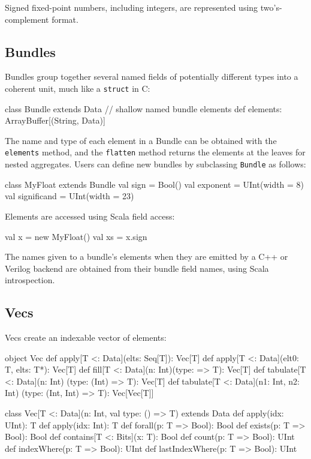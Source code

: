 \documentclass[10pt,twocolumn]{article}
\def\code#1{{\small\tt #1}}
\begin{document}
\noindent
Signed fixed-point
numbers, including integers, are represented using two's-complement
format.  

\subsection{Bundles}

Bundles group together several named fields of potentially different
types into a coherent unit, much like a \code{struct} in C:

\begin{scala}
class Bundle extends Data {
  // shallow named bundle elements
  def elements: ArrayBuffer[(String, Data)]
}
\end{scala}

\noindent
The name and type of each element in a Bundle can be obtained with the
\code{elements} method, and the \code{flatten} method returns the
elements at the leaves for nested aggregates.  Users can define new
bundles by subclassing \code{Bundle} as follows:

\begin{scala}
class MyFloat extends Bundle {
  val sign        = Bool()
  val exponent    = UInt(width = 8)
  val significand = UInt(width = 23)
}
\end{scala}
\noindent
Elements are accessed using Scala field access:

\begin{scala}
val x  = new MyFloat()
val xs = x.sign
\end{scala}

The names given to a bundle's elements when they are emitted by a C++
or Verilog backend are obtained from their bundle field names, using
Scala introspection.

\subsection{Vecs}

Vecs create an indexable vector of elements: 

\begin{scala}
object Vec {
  def apply[T <: Data](elts: Seq[T]): Vec[T]
  def apply[T <: Data](elt0: T, elts: T*): Vec[T]
  def fill[T <: Data](n: Int)(type: => T): Vec[T]
  def tabulate[T <: Data](n: Int)
        (type: (Int) => T): Vec[T]
  def tabulate[T <: Data](n1: Int, n2: Int)
        (type: (Int, Int) => T): Vec[Vec[T]]
}

class Vec[T <: Data](n: Int, val type: () => T) 
    extends Data {
  def apply(idx: UInt): T
  def apply(idx: Int): T
  def forall(p: T => Bool): Bool
  def exists(p: T => Bool): Bool
  def contains[T <: Bits](x: T): Bool
  def count(p: T => Bool): UInt
  def indexWhere(p: T => Bool): UInt
  def lastIndexWhere(p: T => Bool): UInt
}
\end{scala}
\end{document}
